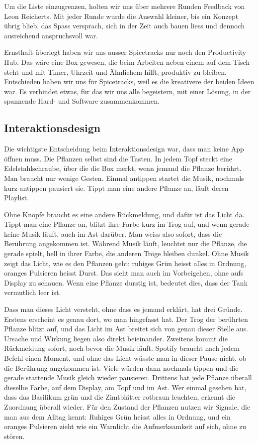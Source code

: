 \documentclass[11pt,a4paper]{article}
\begin{document}
Um die Liste einzugrenzen, holten wir uns über mehrere Runden Feedback von Leon Reicherts. Mit jeder Runde wurde die Auswahl kleiner, bis ein Konzept übrig blieb, das Spass versprach, sich in der Zeit auch bauen liess und dennoch ausreichend anspruchsvoll war.

Ernsthaft überlegt haben wir uns ausser Spicetracks nur noch den Productivity Hub. Das wäre eine Box gewesen, die beim Arbeiten neben einem auf dem Tisch steht und mit Timer, Uhrzeit und Ähnlichem hilft, produktiv zu bleiben. Entschieden haben wir uns für Spicetracks, weil es die kreativere der beiden Ideen war. Es verbindet etwas, für das wir uns alle begeistern, mit einer Lösung, in der spannende Hard- und Software zusammenkommen.

\subsection{Interaktionsdesign}

Die wichtigste Entscheidung beim Interaktionsdesign war, dass man keine App öffnen muss. Die Pflanzen selbst sind die Tasten. In jedem Topf steckt eine Edelstahlschraube, über die die Box merkt, wenn jemand die Pflanze berührt. Man braucht nur wenige Gesten. Einmal antippen startet die Musik, nochmals kurz antippen pausiert sie. Tippt man eine andere Pflanze an, läuft deren Playlist.

Ohne Knöpfe braucht es eine andere Rückmeldung, und dafür ist das Licht da. Tippt man eine Pflanze an, blitzt ihre Farbe kurz im Trog auf, und wenn gerade keine Musik läuft, auch im Ast darüber. Man weiss also sofort, dass die Berührung angekommen ist. Während Musik läuft, leuchtet nur die Pflanze, die gerade spielt, hell in ihrer Farbe, die anderen Tröge bleiben dunkel. Ohne Musik zeigt das Licht, wie es den Pflanzen geht: ruhiges Grün heisst alles in Ordnung, oranges Pulsieren heisst Durst. Das sieht man auch im Vorbeigehen, ohne aufs Display zu schauen. Wenn eine Pflanze durstig ist, bedeutet dies, dass der Tank vermutlich leer ist.

Dass man dieses Licht versteht, ohne dass es jemand erklärt, hat drei Gründe. Erstens erscheint es genau dort, wo man hingefasst hat. Der Trog der berührten Pflanze blitzt auf, und das Licht im Ast breitet sich von genau dieser Stelle aus. Ursache und Wirkung liegen also direkt beieinander. Zweitens kommt die Rückmeldung sofort, noch bevor die Musik läuft. Spotify braucht nach jedem Befehl einen Moment, und ohne das Licht wüsste man in dieser Pause nicht, ob die Berührung angekommen ist. Viele würden dann nochmals tippen und die gerade startende Musik gleich wieder pausieren. Drittens hat jede Pflanze überall dieselbe Farbe, auf dem Display, am Topf und im Ast. Wer einmal gesehen hat, dass das Basilikum grün und die Zimtblätter rotbraun leuchten, erkennt die Zuordnung überall wieder. Für den Zustand der Pflanzen nutzen wir Signale, die man aus dem Alltag kennt: Ruhiges Grün heisst alles in Ordnung, und ein oranges Pulsieren zieht wie ein Warnlicht die Aufmerksamkeit auf sich, ohne zu stören.
\end{document}

